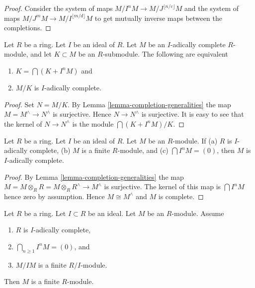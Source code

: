 \begin{proof}
Consider the system of maps
$M/I^nM \to M/J^{\lfloor n/c \rfloor}M$ and
the system of maps $M/J^mM \to M/I^{\lfloor m/d \rfloor}M$
to get mutually inverse maps between the completions.
\end{proof}

\begin{lemma}
\label{lemma-quotient-complete}
Let $R$ be a ring. Let $I$ be an ideal of $R$.
Let $M$ be an $I$-adically complete $R$-module,
and let $K \subset M$ be an $R$-submodule.
The following are equivalent
\begin{enumerate}
\item $K = \bigcap (K + I^nM)$ and
\item $M/K$ is $I$-adically complete.
\end{enumerate}
\end{lemma}

\begin{proof}
Set $N = M/K$. By
Lemma \ref{lemma-completion-generalities}
the map $M = M^\wedge \to N^\wedge$ is surjective.
Hence $N \to N^\wedge$ is surjective. It is easy to see that the
kernel of $N \to N^\wedge$ is the module $\bigcap (K + I^nM) / K$.
\end{proof}

\begin{lemma}
\label{lemma-when-finite-module-complete-over-complete-ring}
Let $R$ be a ring. Let $I$ be an ideal of $R$.
Let $M$ be an $R$-module.
If (a) $R$ is $I$-adically complete, (b) $M$ is a finite $R$-module,
and (c) $\bigcap I^nM = (0)$, then $M$ is $I$-adically complete.
\end{lemma}

\begin{proof}
By Lemma \ref{lemma-completion-generalities}
the map $M = M \otimes_R R = M \otimes_R R^\wedge \to M^\wedge$
is surjective. The kernel of this map is $\bigcap I^nM$ hence zero
by assumption. Hence $M \cong M^\wedge$ and $M$ is complete.
\end{proof}

\begin{lemma}
\label{lemma-finite-over-complete-ring}
Let $R$ be a ring. Let $I \subset R$ be an ideal. Let $M$ be an $R$-module.
Assume
\begin{enumerate}
\item $R$ is $I$-adically complete,
\item $\bigcap_{n \geq 1} I^nM = (0)$, and
\item $M/IM$ is a finite $R/I$-module.
\end{enumerate}
Then $M$ is a finite $R$-module.
\end{lemma}


